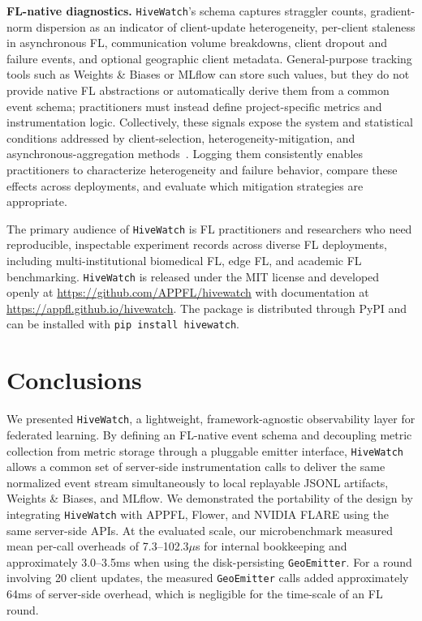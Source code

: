\documentclass[preprint,12pt, a4paper]{elsarticle}
\newcommand{\rev}[1]{{\color{blue}#1}}
\newcommand{\rev}[1]{#1}
\begin{document}
\textbf{FL-native diagnostics.} \texttt{HiveWatch}'s schema captures straggler counts, \rev{gradient-norm dispersion} as an indicator of client-update heterogeneity, per-client staleness in asynchronous FL, communication volume breakdowns, client dropout and failure events, and optional geographic client metadata. General-purpose tracking tools such as Weights \& Biases or MLflow can store such values, but they do not provide native FL abstractions or automatically derive them from a common event schema; practitioners must instead define project-specific metrics and instrumentation logic. Collectively, these signals expose the system and statistical conditions addressed by client-selection, heterogeneity-mitigation, and asynchronous-aggregation methods~\cite{chen2024adaptive,xie2019asynchronous,li2024fedcompass,lai2021oort,chen2023exploring}. Logging them consistently enables practitioners to characterize heterogeneity and failure behavior, compare these effects across deployments, and evaluate which mitigation strategies are appropriate.

The primary audience of \texttt{HiveWatch} is FL practitioners and researchers who need reproducible, inspectable experiment records across diverse FL deployments, including multi-institutional biomedical FL, edge FL, and academic FL benchmarking. \texttt{HiveWatch} is released under the MIT license and developed openly at \url{https://github.com/APPFL/hivewatch} with documentation at \url{https://appfl.github.io/hivewatch}. The package is distributed through PyPI and can be installed with \texttt{pip install hivewatch}.

\section{Conclusions}
\label{sec:conclusion}
We presented \texttt{HiveWatch}, a lightweight, framework-agnostic observability layer for federated learning. By defining an FL-native event schema and decoupling metric collection from metric storage through a pluggable emitter interface, \texttt{HiveWatch} allows a common set of server-side instrumentation calls to deliver the same normalized event stream simultaneously to local replayable JSONL artifacts, Weights \& Biases, and MLflow. We demonstrated the portability of the design by integrating \texttt{HiveWatch} with APPFL, Flower, and NVIDIA FLARE using the same server-side APIs. At the evaluated scale, our microbenchmark measured mean per-call overheads of 7.3--102.3$\mu$s for internal bookkeeping and approximately 3.0--3.5ms when using the disk-persisting \texttt{GeoEmitter}. For a round involving 20 client updates, the measured \texttt{GeoEmitter} calls added approximately 64ms of server-side overhead, which is negligible for the time-scale of an FL round.
\end{document}
